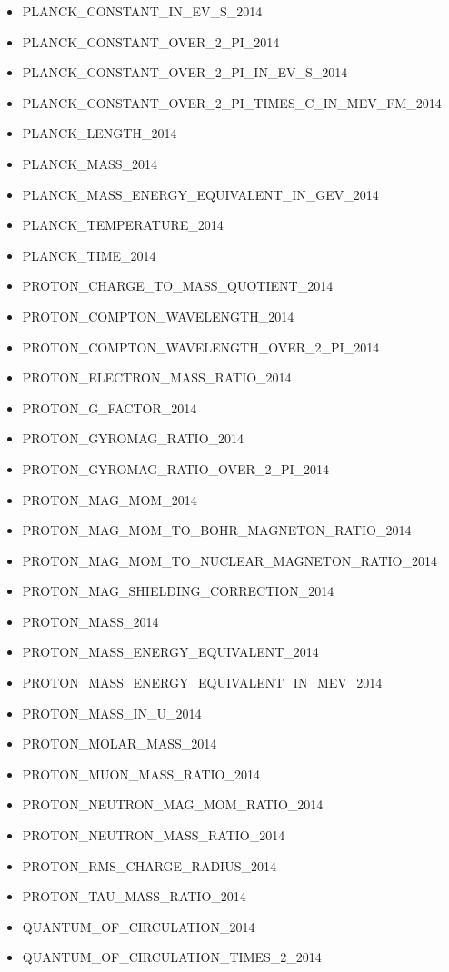 \begin{itemize}
\item PLANCK\_CONSTANT\_IN\_EV\_S\_2014
\item PLANCK\_CONSTANT\_OVER\_2\_PI\_2014
\item PLANCK\_CONSTANT\_OVER\_2\_PI\_IN\_EV\_S\_2014
\item PLANCK\_CONSTANT\_OVER\_2\_PI\_TIMES\_C\_IN\_MEV\_FM\_2014
\item PLANCK\_LENGTH\_2014
\item PLANCK\_MASS\_2014
\item PLANCK\_MASS\_ENERGY\_EQUIVALENT\_IN\_GEV\_2014
\item PLANCK\_TEMPERATURE\_2014
\item PLANCK\_TIME\_2014
\item PROTON\_CHARGE\_TO\_MASS\_QUOTIENT\_2014
\item PROTON\_COMPTON\_WAVELENGTH\_2014
\item PROTON\_COMPTON\_WAVELENGTH\_OVER\_2\_PI\_2014
\item PROTON\_ELECTRON\_MASS\_RATIO\_2014
\item PROTON\_G\_FACTOR\_2014
\item PROTON\_GYROMAG\_RATIO\_2014
\item PROTON\_GYROMAG\_RATIO\_OVER\_2\_PI\_2014
\item PROTON\_MAG\_MOM\_2014
\item PROTON\_MAG\_MOM\_TO\_BOHR\_MAGNETON\_RATIO\_2014
\item PROTON\_MAG\_MOM\_TO\_NUCLEAR\_MAGNETON\_RATIO\_2014
\item PROTON\_MAG\_SHIELDING\_CORRECTION\_2014
\item PROTON\_MASS\_2014
\item PROTON\_MASS\_ENERGY\_EQUIVALENT\_2014
\item PROTON\_MASS\_ENERGY\_EQUIVALENT\_IN\_MEV\_2014
\item PROTON\_MASS\_IN\_U\_2014
\item PROTON\_MOLAR\_MASS\_2014
\item PROTON\_MUON\_MASS\_RATIO\_2014
\item PROTON\_NEUTRON\_MAG\_MOM\_RATIO\_2014
\item PROTON\_NEUTRON\_MASS\_RATIO\_2014
\item PROTON\_RMS\_CHARGE\_RADIUS\_2014
\item PROTON\_TAU\_MASS\_RATIO\_2014
\item QUANTUM\_OF\_CIRCULATION\_2014
\item QUANTUM\_OF\_CIRCULATION\_TIMES\_2\_2014

\end{itemize}
